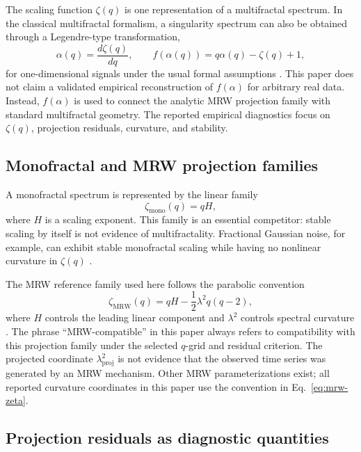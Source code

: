 The scaling function \(\zeta(q)\) is one representation of a multifractal
spectrum. In the classical multifractal formalism, a singularity spectrum can
also be obtained through a Legendre-type transformation,
\begin{equation}
  \alpha(q)=\frac{d\zeta(q)}{dq}, \qquad
  f(\alpha(q))=q\alpha(q)-\zeta(q)+1,
  \label{eq:legendre-spectrum}
\end{equation}
for one-dimensional signals under the usual formal assumptions
\cite{halsey1986fractal,chhabra1989direct}. This paper does not claim a
validated empirical reconstruction of \(f(\alpha)\) for arbitrary real data.
Instead, \(f(\alpha)\) is used to connect the analytic MRW projection family
with standard multifractal geometry. The reported empirical diagnostics focus
on \(\zeta(q)\), projection residuals, curvature, and stability.

\subsection{Monofractal and MRW projection families}

A monofractal spectrum is represented by the linear family
\begin{equation}
  \zeta_{\mathrm{mono}}(q)=qH,
  \label{eq:mono-zeta}
\end{equation}
where \(H\) is a scaling exponent. This family is an essential competitor:
stable scaling by itself is not evidence of multifractality. Fractional
Gaussian noise, for example, can exhibit stable monofractal scaling while
having no nonlinear curvature in \(\zeta(q)\)
\cite{mandelbrot1968fractional}.

The MRW reference family used here follows the parabolic convention
\begin{equation}
  \zeta_{\mathrm{MRW}}(q)=qH-\frac{1}{2}\lambda^2 q(q-2),
  \label{eq:mrw-zeta}
\end{equation}
where \(H\) controls the leading linear component and \(\lambda^2\) controls
spectral curvature \cite{bacry2001multifractal,bacry2003log}. The phrase
``MRW-compatible'' in this paper always refers to compatibility with this
projection family under the selected \(q\)-grid and residual criterion. The
projected coordinate \(\lambda^2_{\mathrm{proj}}\) is not evidence that the
observed time series was generated by an MRW mechanism. Other MRW
parameterizations exist; all reported curvature coordinates in this paper use
the convention in Eq.~\eqref{eq:mrw-zeta}.

\subsection{Projection residuals as diagnostic quantities}

